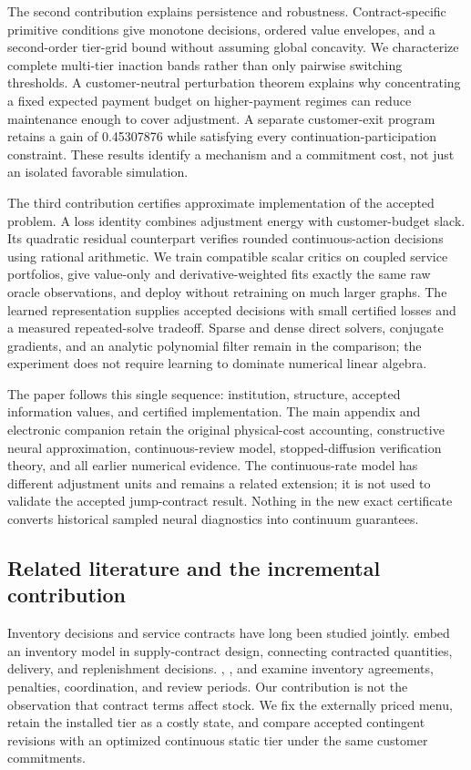 \documentclass[11pt,letterpaper]{article}
\theoremstyle{definition}
\newcommand{\1}{\mathbf 1}
\begin{document}
The second contribution explains persistence and robustness. Contract-specific primitive conditions give monotone decisions, ordered value envelopes, and a second-order tier-grid bound without assuming global concavity. We characterize complete multi-tier inaction bands rather than only pairwise switching thresholds. A customer-neutral perturbation theorem explains why concentrating a fixed expected payment budget on higher-payment regimes can reduce maintenance enough to cover adjustment. A separate customer-exit program retains a gain of 0.45307876 while satisfying every continuation-participation constraint. These results identify a mechanism and a commitment cost, not just an isolated favorable simulation.

The third contribution certifies approximate implementation of the accepted problem. A loss identity combines adjustment energy with customer-budget slack. Its quadratic residual counterpart verifies rounded continuous-action decisions using rational arithmetic. We train compatible scalar critics on coupled service portfolios, give value-only and derivative-weighted fits exactly the same raw oracle observations, and deploy without retraining on much larger graphs. The learned representation supplies accepted decisions with small certified losses and a measured repeated-solve tradeoff. Sparse and dense direct solvers, conjugate gradients, and an analytic polynomial filter remain in the comparison; the experiment does not require learning to dominate numerical linear algebra.

The paper follows this single sequence: institution, structure, accepted information values, and certified implementation. The main appendix and electronic companion retain the original physical-cost accounting, constructive neural approximation, continuous-review model, stopped-diffusion verification theory, and all earlier numerical evidence. The continuous-rate model has different adjustment units and remains a related extension; it is not used to validate the accepted jump-contract result. Nothing in the new exact certificate converts historical sampled neural diagnostics into continuum guarantees.

\subsection{Related literature and the incremental contribution}
Inventory decisions and service contracts have long been studied jointly. \citet{Henig1997} embed an inventory model in supply-contract design, connecting contracted quantities, delivery, and replenishment decisions. \citet{LiangAtkins2013}, \citet{Sieke2012}, and \citet{Katok2008} examine inventory agreements, penalties, coordination, and review periods. Our contribution is not the observation that contract terms affect stock. We fix the externally priced menu, retain the installed tier as a costly state, and compare accepted contingent revisions with an optimized continuous static tier under the same customer commitments.
\end{document}

